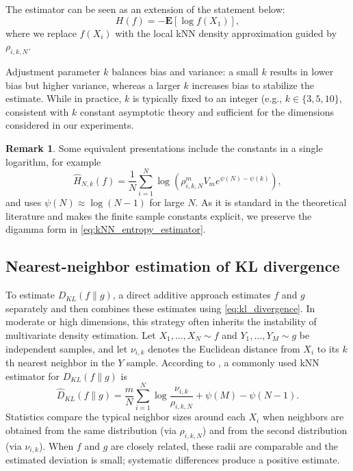 \documentclass[12pt,a4paper]{article}
\newcommand{\E}{\mathbf {E}}
\theoremstyle{definition}
\newtheorem{remark}[definition]{Remark}
\theoremstyle{plain}
\begin{document}
{The estimator can be seen as an extension of the statement below:
\[
H(f) = -\E[\log f(X_1)],
\]
where we replace $f(X_i)$ with
the local kNN density approximation guided by $\rho_{i,k,N}$.

Adjustment parameter $k$ balances bias and variance: a small $k$ results in lower bias but higher variance, whereas a larger $k$ increases bias to stabilize the estimate. While in practice, $k$ is typically fixed to an integer (e.g., $k\in\{3,5,10\}$, consistent with $k$ constant asymptotic theory and sufficient for the dimensions considered in our experiments.

\begin{remark}
Some equivalent presentations include the constants in a single logarithm, for example
\[
\widehat{H}_{N,k}(f)
= \frac{1}{N}\sum_{i=1}^{N}\log\!\left(\rho_{i,k,N}^m V_m e^{\psi(N)-\psi(k)}\right),
\]
and uses $\psi(N)\approx \log(N-1)$ for large $N$. As it is standard in the theoretical literature and makes the finite sample constants explicit, we preserve the digamma form in
\eqref{eq:kNN_entropy_estimator}.
\end{remark}

\subsection{Nearest-neighbor estimation of KL divergence}

To estimate $D_{KL}(f\|g)$, a direct additive approach estimates $f$ and $g$ separately and then combines these estimates using \eqref{eq:kl_divergence}. In moderate or high dimensions, this strategy often inherits the instability of multivariate density estimation.
Let $X_1,\dots,X_N\sim f$ and $Y_1,\dots,Y_M\sim g$ be independent samples, and let $\nu_{i,k}$ denotes the  Euclidean distance from $X_i$ to its $k$th nearest neighbor in the $Y$ sample. According to \cite{perez2008kullback,leonenko2008,Wang2009}, a commonly used kNN estimator for $D_{KL}(f\|g)$ is
\begin{equation}\label{eq:KL_kNN_estimator}
\widehat{D}_{KL}(f\|g)
= \frac{m}{N}\sum_{i=1}^{N}\log\frac{\nu_{i,k}}{\rho_{i,k,N}}
+ \psi(M) - \psi(N-1).
\end{equation}
Statistics compare the typical neighbor sizes around each $X_i$ when neighbors are obtained from the same distribution (via $\rho_{i,k,N}$) and from the second distribution (via $\nu_{i,k}$). When $f$ and $g$ are closely related, these radii are comparable and the estimated deviation is small; systematic differences produce a positive estimate.

}
\end{document}

